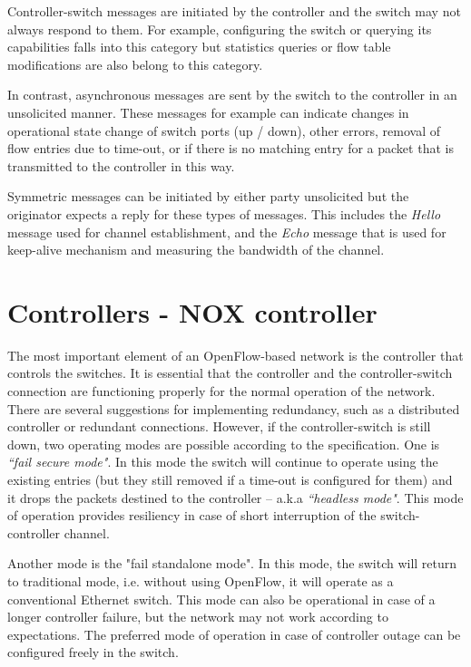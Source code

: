 \documentclass[a4paper]{article}
\begin{document}
Controller-switch messages are initiated by the controller and the switch may not always respond to them. For example,
configuring the switch or querying its capabilities falls into this category but statistics queries or flow table
modifications are also belong to this category.

In contrast, asynchronous messages are sent by the switch to the controller in an unsolicited manner. These messages
for example can indicate changes in  operational state change of switch ports (up / down), other errors, removal of
flow entries due to time-out, or if there is no matching entry for a packet that is transmitted to the controller in
this way.

Symmetric messages can be initiated by either party unsolicited but the originator expects a reply for these types of
messages. This includes the \emph{Hello} message used for channel establishment, and the \emph{Echo} message that is
used for keep-alive mechanism and measuring the bandwidth of the channel.

\section{Controllers - NOX controller}

The most important element of an OpenFlow-based network is the controller that controls the switches. It is essential
that the controller and the controller-switch connection are functioning properly for the normal operation of the
network. There are several suggestions for implementing redundancy, such as a distributed controller or redundant
connections.
However, if the controller-switch is still down, two operating modes are possible according to the specification. One
is \emph{``fail secure mode"}. In this mode the switch will continue to operate using the existing entries (but they
still removed if a time-out is configured for them) and it drops the packets destined to the controller -- a.k.a
\emph{``headless mode"}. This mode of operation provides resiliency in case of short interruption of the
switch-controller channel.

Another mode is the "fail standalone mode". In this mode, the switch will return to traditional mode, i.e. without
using OpenFlow, it will operate as a conventional Ethernet switch. This mode can also be operational in case of a
longer controller failure, but the network may not work according to expectations. The preferred mode of operation in
case of controller outage can be configured freely in the switch.
\end{document}
